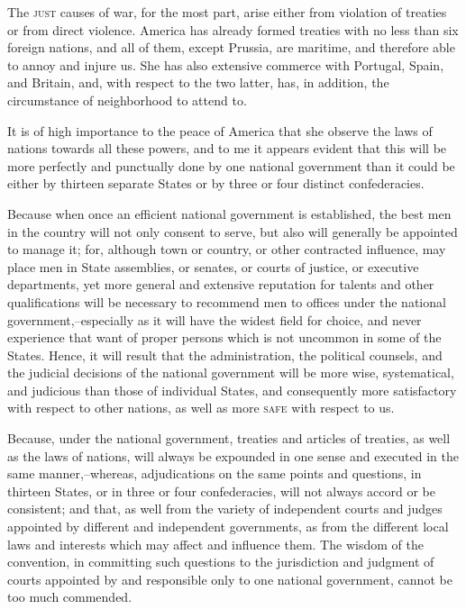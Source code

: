 The \textsc{just }causes of war, for the most part, arise either from violation of treaties or from direct violence. America has already formed treaties with no less than six foreign nations, and all of them, except Prussia, are maritime, and therefore able to annoy and injure us. She has also extensive commerce with Portugal, Spain, and Britain, and, with respect to the two latter, has, in addition, the circumstance of neighborhood to attend to.

It is of high importance to the peace of America that she observe the laws of nations towards all these powers, and to me it appears evident that this will be more perfectly and punctually done by one national government than it could be either by thirteen separate States or by three or four distinct confederacies.

Because when once an efficient national government is established, the best men in the country will not only consent to serve, but also will generally be appointed to manage it; for, although town or country, or other contracted influence, may place men in State assemblies, or senates, or courts of justice, or executive departments, yet more general and extensive reputation for talents and other qualifications will be necessary to recommend men to offices under the national government,--especially as it will have the widest field for choice, and never experience that want of proper persons which is not uncommon in some of the States. Hence, it will result that the administration, the political counsels, and the judicial decisions of the national government will be more wise, systematical, and judicious than those of individual States, and consequently more satisfactory with respect to other nations, as well as more \textsc{safe }with respect to us.

Because, under the national government, treaties and articles of treaties, as well as the laws of nations, will always be expounded in one sense and executed in the same manner,--whereas, adjudications on the same points and questions, in thirteen States, or in three or four confederacies, will not always accord or be consistent; and that, as well from the variety of independent courts and judges appointed by different and independent governments, as from the different local laws and interests which may affect and influence them. The wisdom of the convention, in committing such questions to the jurisdiction and judgment of courts appointed by and responsible only to one national government, cannot be too much commended.

